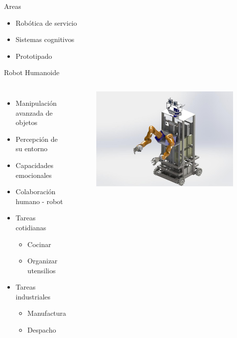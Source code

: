 \documentclass[10pt]{beamer}
\begin{document}
\begin{frame}{Areas}
   \begin{itemize}
      \item Robótica de servicio
      \item Sistemas cognitivos
      \item Prototipado
   \end{itemize}
\end{frame}

\begin{frame}{Robot Humanoide}
  \begin{columns}
        \begin{itemize}
          \item Manipulación avanzada de objetos
          \item Percepción de su entorno
          \item Capacidades emocionales
          \item Colaboración humano - robot
          \item Tareas cotidianas
          	\begin{itemize}
          		\item Cocinar
                \item Organizar utensilios
          	\end{itemize}
          \item Tareas industriales
          	\begin{itemize}
          		\item Manufactura
                \item Despacho
          	\end{itemize}
         \end{itemize}
         \begin{center}
            \begin{figure}
               \includegraphics[width=1\textwidth]{img/robot.jpg}
            \end{figure}
         \end{center}
  \end{columns}
\end{frame}
\end{document}
